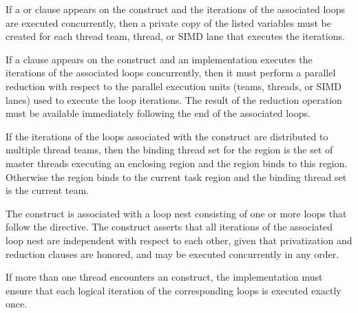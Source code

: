 
If a  or  clause appears on the
 construct and the iterations of the associated loops are
executed concurrently, then a private copy of the listed variables must be
created for each thread team, thread, or SIMD lane that executes the
iterations.

If a  clause appears on the  construct and an
implementation executes the iterations of the associated loops concurrently,
then it must perform a parallel reduction with respect to the parallel
execution units (teams, threads, or SIMD lanes) used to execute the loop
iterations. The result of the reduction operation must be available immediately
following the end of the associated loops.

\binding
If the iterations of the loops associated with the  construct
are distributed to multiple thread teams, then the binding thread set for the
 region is the set of master threads executing an enclosing
 region and the  region binds to this 
region. Otherwise the  region binds to the current task region
and the binding thread set is the current team.


\descr
The  construct is associated with a loop nest consisting of
one or more loops that follow the directive. The construct asserts that all
iterations of the associated loop nest are independent with respect to each
other, given that privatization and reduction clauses are honored, and may be
executed concurrently in any order.

If more than one thread encounters an  construct, the
implementation must ensure that each logical iteration of the corresponding
loops is executed exactly once.


